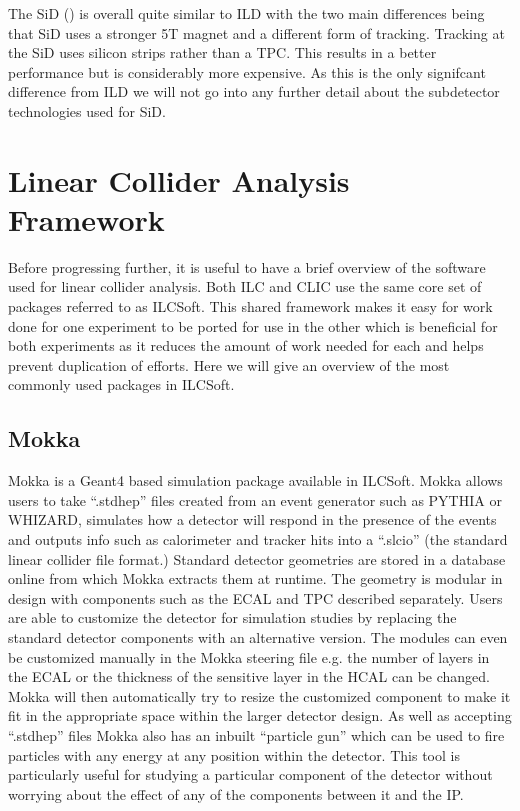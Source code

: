 The \ac{SiD} () is overall quite similar to ILD with the two main differences being that SiD uses a stronger 5T magnet and a different form of tracking. Tracking at the SiD uses silicon strips rather than a TPC. This results in a better performance but is considerably more expensive. As this is the only signifcant difference from ILD we will not go into any further detail about the subdetector technologies used for SiD.

\section{Linear Collider Analysis Framework}

Before progressing further, it is useful to have a brief overview of the software used for linear collider analysis. Both \ac{ILC} and \ac{CLIC} use the same core set of packages referred to as ILCSoft. This shared framework makes it easy for work done for one experiment to be ported for use in the other which is beneficial for both experiments as it reduces the amount of work needed for each and helps prevent duplication of efforts. Here we will give an overview of the most commonly used packages in ILCSoft.

\subsection{Mokka}
Mokka is a Geant4 based simulation package available in ILCSoft. Mokka allows users to take ``.stdhep'' files created from an event generator such as PYTHIA or WHIZARD, simulates how a detector will respond in the presence of the events and outputs info such as calorimeter and tracker hits into a ``.slcio'' (the standard linear collider file format.) Standard detector geometries are stored in a database online from which Mokka extracts them at runtime. The geometry is modular in design with components such as the ECAL and TPC described separately. Users are able to customize the detector for simulation studies by replacing the standard detector components with an alternative version. The modules can even be customized manually in the Mokka steering file e.g. the number of layers in the ECAL or the thickness of the sensitive layer in the HCAL can be changed. Mokka will then automatically try to resize the customized component to make it fit in the appropriate space within the larger detector design. As well as accepting ``.stdhep'' files Mokka also has an inbuilt ``particle gun'' which can be used to fire particles with any energy at any position within the detector. This tool is particularly useful for studying a particular component of the detector without worrying about the effect of any of the components between it and the \ac{IP}.

